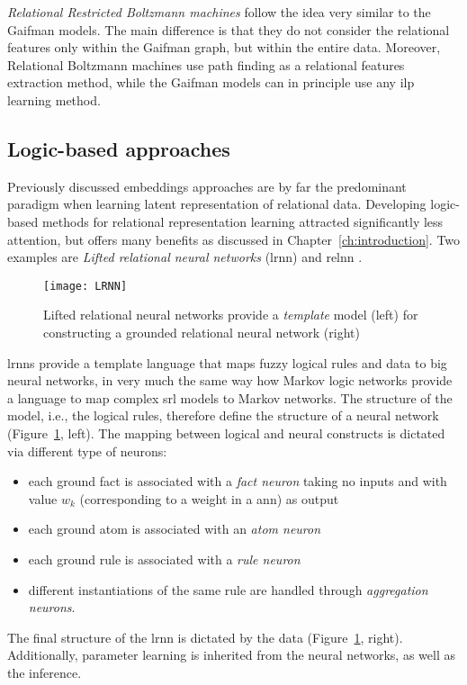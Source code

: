 \textit{Relational Restricted Boltzmann machines} follow the idea very similar to the Gaifman models.
The main difference is that they do not consider the relational features only within the Gaifman graph, but within the entire data.
Moreover, Relational Boltzmann machines use path finding as a relational features extraction method, while the Gaifman models can in principle use any \gls{ilp} learning method.






\subsection{Logic-based approaches}


Previously discussed embeddings approaches are by far the predominant paradigm when learning latent representation of relational data.
Developing logic-based methods for relational representation learning attracted significantly less attention, but offers many benefits as discussed in Chapter~\ref{ch:introduction}.
Two examples are \textit{Lifted relational neural networks} (\gls{lrnn}) \cite{LRNN} and \gls{relnn} \cite{Kazemi2018}.

\begin{figure}
	\medskip
	\centering
	\texttt{[image: LRNN]}
	\caption[Lifted relational neural networks]{Lifted relational neural networks provide a \textit{template} model (left) for constructing a grounded relational neural network (right)\label{fig:lrnn}}
\end{figure}



\gls{lrnn}s provide a template language that maps  fuzzy logical rules and data to big neural networks, in very much the same way how Markov logic networks provide a language to map complex \gls{srl} models to Markov networks.
The structure of the model, i.e.,  the logical rules, therefore define the structure of a neural network (Figure~\ref{fig:lrnn}, left).
The mapping between logical and neural constructs is dictated via different type of neurons:
\begin{itemize}
	\item each ground fact is associated with a \textit{fact neuron} taking no inputs and with value $w_k$ (corresponding to a weight in a \gls{ann}) as output
	\item each ground atom is associated with an \textit{atom neuron}
	\item each ground rule is associated with a \textit{rule neuron}
	\item different instantiations of the same rule are handled through \textit{aggregation neurons}.
\end{itemize}
The final structure of the \gls{lrnn} is dictated by the data (Figure~\ref{fig:lrnn}, right).
Additionally, parameter learning is inherited from the neural networks, as well as the inference.




